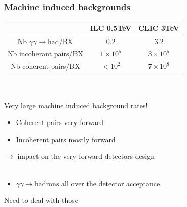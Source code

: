 \documentclass{beamer}
\begin{document}
\begin{frame}
\frametitle{Machine induced backgrounds}
\begin{tabular}{ccc}
 & ILC 0.5TeV & CLIC 3TeV\\
\hline
Nb $\gamma\gamma\to\textrm{had}$/BX & 0.2 & \alert{3.2}\\
\hline
Nb incoherant pairs/BX & $1\times 10^5$ & \alert{$3\times10^5$}\\
\hline
Nb coherent pairs/BX & $<10^2$ & $7\times 10^8$\\
\hline
\end{tabular}\\
~\\
\alert{Very large machine induced background rates!}\\
\begin{itemize}
  \item Coherent pairs very forward
  \item Incoherent pairs mostly forward
\end{itemize}
$\to$ impact on the very forward detectors design\\
~\\
\begin{itemize}
  \item $\gamma\gamma\to\textrm{hadrons}$ all over the detector acceptance.
\end{itemize}
\alert{Need to deal with those}
\end{frame}
\end{document}
